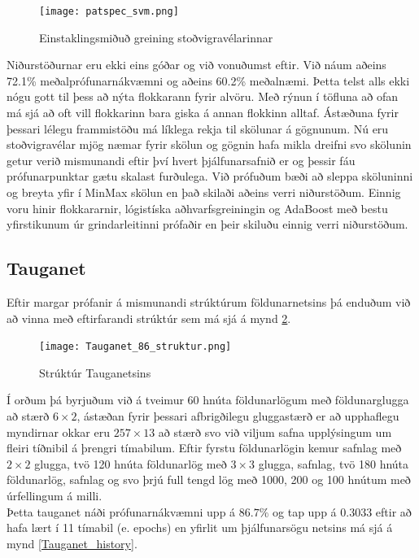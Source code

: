 \documentclass[11pt]{article}
\begin{document}
\begin{figure}[h]
    \centering
    \texttt{[image: patspec\_svm.png]}
    \caption{Einstaklingsmiðuð greining stoðvigravélarinnar}
    \label{patspec_svm}
\end{figure}

Niðurstöðurnar eru ekki eins góðar og við vonuðumst eftir. Við náum aðeins 72.1\% meðalprófunarnákvæmni og aðeins 60.2\% meðalnæmi. Þetta telst alls ekki nógu gott til þess að nýta flokkarann fyrir alvöru. Með rýnun í töfluna að ofan má sjá að oft vill flokkarinn bara giska á annan flokkinn alltaf. Ástæðuna fyrir þessari lélegu frammistöðu má líklega rekja til skölunar á gögnunum. Nú eru stoðvigravélar mjög næmar fyrir skölun og gögnin hafa mikla dreifni svo skölunin getur verið mismunandi eftir því hvert þjálfunarsafnið er og þessir fáu prófunarpunktar gætu skalast furðulega. Við prófuðum bæði að sleppa sköluninni og breyta yfir í MinMax skölun en það skilaði aðeins verri niðurstöðum. Einnig voru hinir flokkararnir, lógistíska aðhvarfsgreiningin og AdaBoost með bestu yfirstikunum úr grindarleitinni prófaðir en þeir skiluðu einnig verri niðurstöðum.

\subsection{Tauganet}
Eftir margar prófanir á mismunandi strúktúrum földunarnetsins þá enduðum við að vinna með eftirfarandi strúktúr sem má sjá á mynd \ref{Tauganet_sktruktur}.

\begin{figure}[h]
    \centering
    \texttt{[image: Tauganet\_86\_struktur.png]}
    \caption{Strúktúr Tauganetsins}
    \label{Tauganet_sktruktur}
\end{figure}

Í orðum þá byrjuðum við á tveimur 60 hnúta földunarlögum með földunarglugga að stærð $6\times 2$, ástæðan fyrir þessari afbrigðilegu gluggastærð er að upphaflegu myndirnar okkar eru $257\times 13$ að stærð svo við viljum safna upplýsingum um fleiri tíðnibil á þrengri tímabilum. Eftir fyrstu földunarlögin kemur safnlag með $2\times 2$ glugga, tvö 120 hnúta földunarlög með $3\times 3$ glugga, safnlag, tvö 180 hnúta földunarlög, safnlag og svo þrjú full tengd lög með 1000, 200 og 100 hnútum með úrfellingum á milli. \\
Þetta tauganet náði prófunarnákvæmni upp á $86.7\%$ og tap upp á $0.3033$ eftir að hafa lært í 11 tímabil (e. epochs) en yfirlit um þjálfunarsögu netsins má sjá á mynd \ref{Tauganet_history}.
\end{document}
